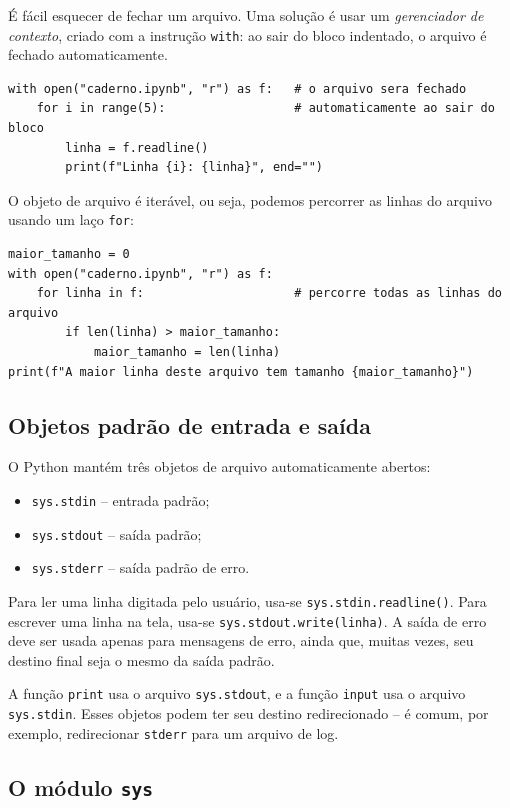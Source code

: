 \documentclass[11pt,a4paper]{article}
\begin{document}
É fácil esquecer de fechar um arquivo. Uma solução é usar um
\emph{gerenciador de contexto}, criado com a instrução \texttt{with}: ao
sair do bloco indentado, o arquivo é fechado automaticamente.

\begin{lstlisting}
with open("caderno.ipynb", "r") as f:   # o arquivo sera fechado
    for i in range(5):                  # automaticamente ao sair do bloco
        linha = f.readline()
        print(f"Linha {i}: {linha}", end="")
\end{lstlisting}

O objeto de arquivo é iterável, ou seja, podemos percorrer as linhas do
arquivo usando um laço \texttt{for}:

\begin{lstlisting}
maior_tamanho = 0
with open("caderno.ipynb", "r") as f:
    for linha in f:                     # percorre todas as linhas do arquivo
        if len(linha) > maior_tamanho:
            maior_tamanho = len(linha)
print(f"A maior linha deste arquivo tem tamanho {maior_tamanho}")
\end{lstlisting}

\subsection{Objetos padrão de entrada e saída}

O Python mantém três objetos de arquivo automaticamente abertos:

\begin{itemize}
\item \texttt{sys.stdin} -- entrada padrão;
\item \texttt{sys.stdout} -- saída padrão;
\item \texttt{sys.stderr} -- saída padrão de erro.
\end{itemize}

Para ler uma linha digitada pelo usuário, usa-se
\texttt{sys.stdin.readline()}. Para escrever uma linha na tela, usa-se
\texttt{sys.stdout.write(linha)}. A saída de erro deve ser usada apenas
para mensagens de erro, ainda que, muitas vezes, seu destino final seja o
mesmo da saída padrão.

A função \texttt{print} usa o arquivo \texttt{sys.stdout}, e a função
\texttt{input} usa o arquivo \texttt{sys.stdin}. Esses objetos podem ter
seu destino redirecionado -- é comum, por exemplo, redirecionar
\texttt{stderr} para um arquivo de log.

\subsection{O módulo \texttt{sys}}
\end{document}
